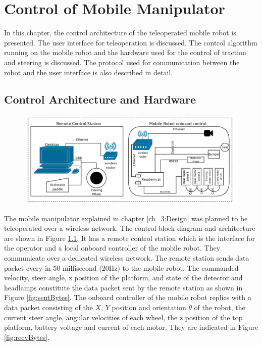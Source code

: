 \chapter{Control of Mobile Manipulator }
\label{c5_Control}
In this chapter, the control architecture of the teleoperated  mobile robot is presented. The user interface for teleoperation is discussed. The control algorithm  running on the mobile robot and the hardware used for the control of traction and steering is discussed. The protocol used  for communication between the robot and the user interface is also described in detail.
\section{Control Architecture and Hardware}


\begin{figure}
	\includegraphics[width=\linewidth,keepaspectratio]{Chapter3/fig/controlblock}
	\label{fig:ControlBlockDiag} 
\end{figure} 
The mobile manipulator explained in chapter \ref{ch_3:Design} was planned to be teleoperated over a wireless network. The control block diagram and architecture are shown in Figure \ref{fig:ControlBlockDiag}. It has a remote control station which is the interface for the operator and a local onboard controller of the mobile robot. They  communicate over a dedicated wireless network. The remote station sends data packet every in 50 millisecond (20Hz) to the mobile robot. The commanded velocity, steer angle,  z position of the platform, and  state of the detector and headlamps constitute the data packet sent by the remote station as shown in Figure \ref{fig:sentBytes}. The onboard controller of the mobile robot replies with a data packet consisting of the $X$, $Y$ position and orientation $\theta$ of the robot, the current steer angle, angular velocities of each wheel, the z position of the top platform,  battery voltage  and current of each motor. They are indicated in Figure \ref{fig:recvBytes}.
